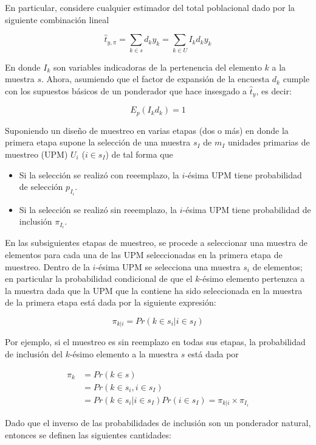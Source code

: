\documentclass[
  12pt,
  spanish,
]{book}
\providecommand{\tightlist}{%
  \setlength{\itemsep}{0pt}\setlength{\parskip}{0pt}}
\begin{document}
En particular, considere cualquier estimador del total poblacional dado por la siguiente combinación lineal

\[
\hat{t}_{y,\pi}=\sum_{k\in s} d_k y_k = \sum_{k\in U} I_k d_k y_k 
\]

En donde \(I_k\) son variables indicadoras de la pertenencia del elemento \(k\) a la muestra \(s\). Ahora, asumiendo que el factor de expansión de la encuesta \(d_k\) cumple con los supuestos básicos de un ponderador que hace insesgado a \(\hat{t}_{y}\), es decir:

\[
E_p(I_k d_k) = 1
\]

Suponiendo un diseño de muestreo en varias etapas (dos o más) en donde la primera etapa supone la selección de una muestra \(s_I\) de \(m_I\) unidades primarias de muestreo (UPM) \(U_i\) (\(i\in s_I\)) de tal forma que

\begin{itemize}
\tightlist
\item
  Si la selección se realizó con reeemplazo, la \(i\)-ésima UPM tiene probabilidad de selección \(p_{I_i}\).
\item
  Si la selección se realizó sin reeemplazo, la \(i\)-ésima UPM tiene probabilidad de inclusión \(\pi_{I_i}\).
\end{itemize}

En las subsiguientes etapas de muestreo, se procede a seleccionar una muestra de elementos para cada una de las UPM seleccionadas en la primera etapa de muestreo. Dentro de la \(i\)-ésima UPM se selecciona una muestra \(s_i\) de elementos; en particular la probabilidad condicional de que el \(k\)-ésimo elemento pertenzca a la muestra dada que la UPM que la contiene ha sido seleccionada en la muestra de la primera etapa está dada por la siguiente expresión:

\[
\pi_{k|i} = Pr(k \in s_i | i \in s_I)
\]

Por ejemplo, si el muestreo es sin reemplazo en todas sus etapas, la probabilidad de inclusión del \(k\)-ésimo elemento a la muestra \(s\) está dada por

\begin{align*}
\pi_k & = Pr(k \in s)\\ 
& = Pr(k \in s_i, i \in s_I) \\
& = Pr(k \in s_i | i \in s_I) Pr(i \in s_I) = \pi_{k|i} \times \pi_{I_i}
\end{align*}

Dado que el inverso de las probabilidades de inclusión son un ponderador natural, entonces se definen las siguientes cantidades:
\end{document}
